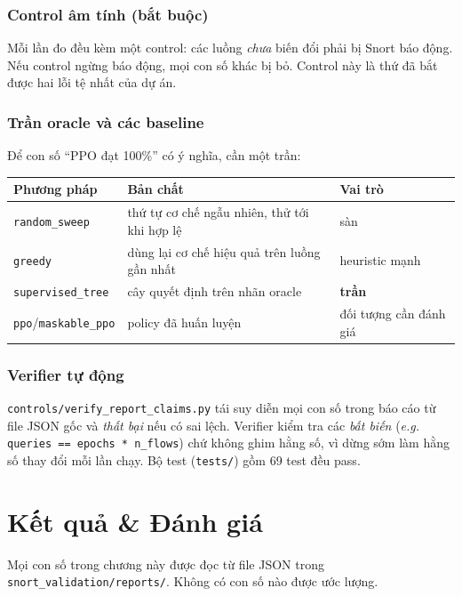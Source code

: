 \documentclass[12pt,a4paper]{report}
\newcommand{\eg}{\emph{e.g.}}
\begin{document}
\subsection{Control âm tính (bắt buộc)}
Mỗi lần đo đều kèm một control: các luồng \emph{chưa} biến đổi phải bị Snort báo động.
Nếu control ngừng báo động, mọi con số khác bị bỏ. Control này là thứ đã bắt được hai
lỗi tệ nhất của dự án.

\subsection{Trần oracle và các baseline}
Để con số ``PPO đạt 100\%'' có ý nghĩa, cần một trần:
\begin{center}
\begin{tabular}{lll}
\toprule
Phương pháp & Bản chất & Vai trò \\
\midrule
\texttt{random\_sweep}   & thứ tự cơ chế ngẫu nhiên, thử tới khi hợp lệ & sàn \\
\texttt{greedy}          & dùng lại cơ chế hiệu quả trên luồng gần nhất & heuristic mạnh \\
\texttt{supervised\_tree}& cây quyết định trên nhãn oracle & \textbf{trần} \\
\texttt{ppo}/\texttt{maskable\_ppo} & policy đã huấn luyện & đối tượng cần đánh giá \\
\bottomrule
\end{tabular}
\end{center}

\subsection{Verifier tự động}
\texttt{controls/verify\_report\_claims.py} tái suy diễn mọi con số trong báo cáo từ
file JSON gốc và \emph{thất bại} nếu có sai lệch. Verifier kiểm tra các \emph{bất biến}
(\eg{} \texttt{queries == epochs * n\_flows}) chứ không ghim hằng số, vì dừng sớm làm
hằng số thay đổi mỗi lần chạy. Bộ test (\texttt{tests/}) gồm 69 test đều pass.

\chapter{Kết quả \& Đánh giá}
\label{ch:results}

Mọi con số trong chương này được đọc từ file JSON trong
\texttt{snort\_validation/reports/}. Không có con số nào được ước lượng.
\end{document}
